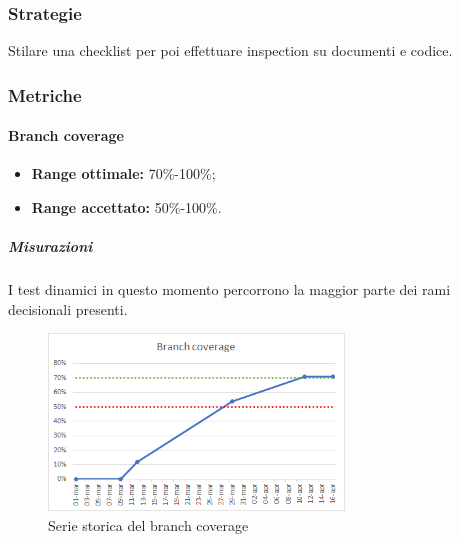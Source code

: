 		\subsubsection{Strategie}
		Stilare una checklist per poi effettuare inspection su documenti e codice.
		\subsubsection{Metriche}
			\paragraph{Branch coverage}  \Spazio
			\begin{itemize}
				\item \textbf{Range ottimale:} 70\%-100\%;
				\item \textbf{Range accettato:} 50\%-100\%.
		    \end{itemize}
	        
	        \subparagraph{Misurazioni}
	        I test dinamici in questo momento percorrono la maggior parte dei rami decisionali presenti. 
	        \begin{figure}[H]
	        	\centering 
	        	\includegraphics[width=0.7\textwidth]{Images/branch.png}
	        	\caption{Serie storica del branch coverage}
	        	\label{branch} 
	        \end{figure}
